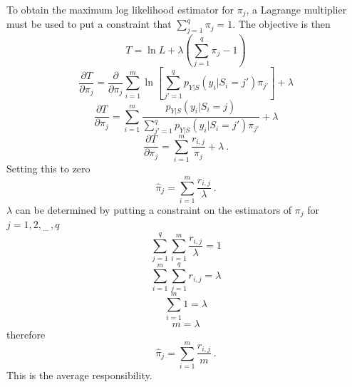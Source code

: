 \documentclass[12pt]{report}
\newcommand{\dotdotdot}{_{\phantom{.}\cdots}}
\begin{document}
To obtain the maximum log likelihood estimator for $\pi_j$, a Lagrange multiplier must be used to put a constraint that $\sum_{j=1}^q\pi_j=1$. The objective is then
\begin{equation*}
T = \ln{L} + \lambda\left(\sum_{j=1}^q\pi_j-1\right)
\end{equation*}
\begin{equation*}
\frac{\partial T}{\partial\pi_j}=\frac{\partial}{\partial\pi_j}\sum_{i=1}^m\ln\left[
\sum_{j'=1}^qp_{Y|S}\left(y_i|S_i=j'\right)\pi_{j'}
\right] + \lambda
\end{equation*}
\begin{equation*}
\frac{\partial T}{\partial\pi_j}=\sum_{i=1}^m\frac{p_{Y|S}\left(y_i|S_i=j\right)}{\sum_{j'=1}^qp_{Y|S}\left(y_i|S_i=j'\right)\pi_{j'}} + \lambda
\end{equation*}
\begin{equation}
\frac{\partial T}{\partial\pi_j}=\sum_{i=1}^m\frac{r_{i,j}}{\pi_j} + \lambda \ .
\end{equation}
Setting this to zero
\begin{equation}
\widehat{\pi}_j = \sum_{i=1}^m\frac{r_{i,j}}{\lambda} \ .
\end{equation}
$\lambda$ can be determined by putting a constraint on the estimators of $\pi_j$ for $j=1,2,\dotdotdot,q$
\begin{equation*}
\sum_{j=1}^q\sum_{i=1}^m\frac{r_{i,j}}{\lambda}=1
\end{equation*}
\begin{equation*}
\sum_{i=1}^m\sum_{j=1}^qr_{i,j}=\lambda
\end{equation*}
\begin{equation*}
\sum_{i=1}^m1=\lambda
\end{equation*}
\begin{equation}
m=\lambda
\end{equation}
therefore
\begin{equation}
\widehat{\pi}_j = \sum_{i=1}^m\frac{r_{i,j}}{m} \ .
\end{equation}
This is the average responsibility.
\end{document}
